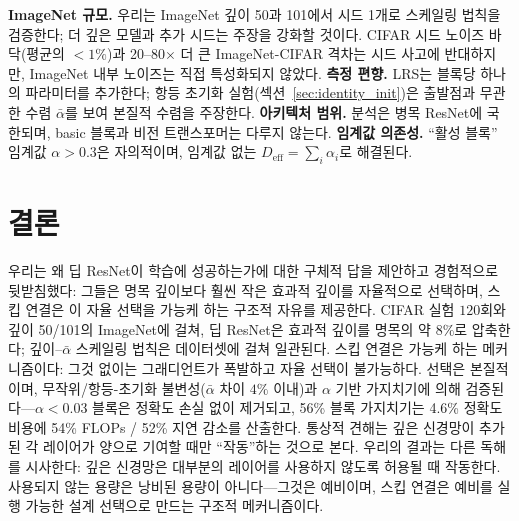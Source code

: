 \documentclass{bmvc2k}
\begin{document}
\textbf{ImageNet 규모.} 우리는 ImageNet 깊이 50과 101에서 시드 1개로 스케일링 법칙을 검증한다; 더 깊은 모델과 추가 시드는 주장을 강화할 것이다. CIFAR 시드 노이즈 바닥(평균의 $<1\%$)과 20--80$\times$ 더 큰 ImageNet-CIFAR 격차는 시드 사고에 반대하지만, ImageNet 내부 노이즈는 직접 특성화되지 않았다. \textbf{측정 편향.} LRS는 블록당 하나의 파라미터를 추가한다; 항등 초기화 실험(섹션~\ref{sec:identity_init})은 출발점과 무관한 수렴 $\bar{\alpha}$를 보여 본질적 수렴을 주장한다. \textbf{아키텍처 범위.} 분석은 병목 ResNet에 국한되며, basic 블록과 비전 트랜스포머는 다루지 않는다. \textbf{임계값 의존성.} ``활성 블록'' 임계값 $\alpha > 0.3$은 자의적이며, 임계값 없는 $D_\text{eff} = \sum_i \alpha_i$로 해결된다.

\section{결론}
\label{sec:conclusion}

우리는 왜 딥 ResNet이 학습에 성공하는가에 대한 구체적 답을 제안하고 경험적으로 뒷받침했다: 그들은 명목 깊이보다 훨씬 작은 효과적 깊이를 자율적으로 선택하며, 스킵 연결은 이 자율 선택을 가능케 하는 구조적 자유를 제공한다. CIFAR 실험 $120$회와 깊이 50/101의 ImageNet에 걸쳐, 딥 ResNet은 효과적 깊이를 명목의 약 $8\%$로 압축한다; 깊이--$\bar{\alpha}$ 스케일링 법칙은 데이터셋에 걸쳐 일관된다. 스킵 연결은 가능케 하는 메커니즘이다: 그것 없이는 그래디언트가 폭발하고 자율 선택이 불가능하다. 선택은 본질적이며, 무작위/항등-초기화 불변성($\bar{\alpha}$ 차이 $4\%$ 이내)과 $\alpha$ 기반 가지치기에 의해 검증된다---$\alpha < 0.03$ 블록은 정확도 손실 없이 제거되고, 56\% 블록 가지치기는 4.6\% 정확도 비용에 54\% FLOPs / 52\% 지연 감소를 산출한다. 통상적 견해는 깊은 신경망이 추가된 각 레이어가 양으로 기여할 때만 ``작동''하는 것으로 본다. 우리의 결과는 다른 독해를 시사한다: 깊은 신경망은 대부분의 레이어를 사용하지 않도록 허용될 때 작동한다. 사용되지 않는 용량은 낭비된 용량이 아니다---그것은 예비이며, 스킵 연결은 예비를 실행 가능한 설계 선택으로 만드는 구조적 메커니즘이다.


\end{document}
